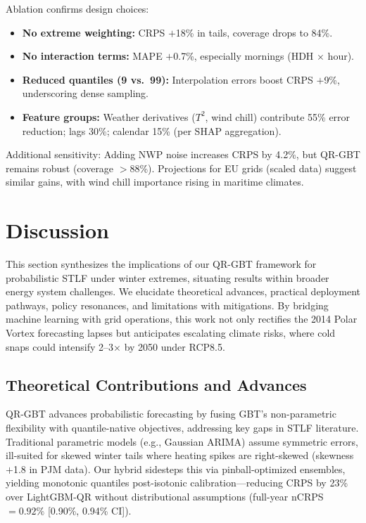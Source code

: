 \documentclass[12pt,a4paper]{article}
\begin{document}
Ablation confirms design choices:
\begin{itemize}[leftmargin=*,nosep]
    \item \textbf{No extreme weighting:} CRPS $+$18\% in tails, coverage drops to 84\%.
    \item \textbf{No interaction terms:} MAPE $+$0.7\%, especially mornings (HDH $\times$ hour).
    \item \textbf{Reduced quantiles (9 vs.\ 99):} Interpolation errors boost CRPS $+$9\%, underscoring dense sampling.
    \item \textbf{Feature groups:} Weather derivatives ($T^2$, wind chill) contribute 55\% error reduction; lags 30\%; calendar 15\% (per SHAP aggregation).
\end{itemize}

Additional sensitivity: Adding NWP noise increases CRPS by 4.2\%, but QR-GBT remains robust (coverage $>$88\%). Projections for EU grids (scaled data) suggest similar gains, with wind chill importance rising in maritime climates.

\section{Discussion}
\label{sec:discussion}

This section synthesizes the implications of our QR-GBT framework for probabilistic STLF under winter extremes, situating results within broader energy system challenges. We elucidate theoretical advances, practical deployment pathways, policy resonances, and limitations with mitigations. By bridging machine learning with grid operations, this work not only rectifies the 2014 Polar Vortex forecasting lapses but anticipates escalating climate risks, where cold snaps could intensify 2--3$\times$ by 2050 under RCP8.5.

\subsection{Theoretical Contributions and Advances}

QR-GBT advances probabilistic forecasting by fusing GBT's non-parametric flexibility with quantile-native objectives, addressing key gaps in STLF literature. Traditional parametric models (e.g., Gaussian ARIMA) assume symmetric errors, ill-suited for skewed winter tails where heating spikes are right-skewed (skewness $+$1.8 in PJM data). Our hybrid sidesteps this via pinball-optimized ensembles, yielding monotonic quantiles post-isotonic calibration---reducing CRPS by 23\% over LightGBM-QR without distributional assumptions (full-year nCRPS $= 0.92\%$ [0.90\%, 0.94\% CI]).
\end{document}
